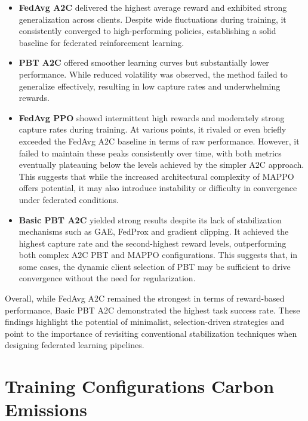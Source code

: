\documentclass[12pt,a4paper,twoside,openany]{book}
\begin{document}
\begin{itemize}
  \item \textbf{FedAvg A2C} delivered the highest average reward and exhibited strong generalization across clients. Despite wide fluctuations during training, it consistently converged to high-performing policies, establishing a solid baseline for federated reinforcement learning.
  
  \item \textbf{PBT A2C} offered smoother learning curves but substantially lower performance. While reduced volatility was observed, the method failed to generalize effectively, resulting in low capture rates and underwhelming rewards.
  
  \item \textbf{FedAvg PPO} showed intermittent high rewards and moderately strong capture rates during training. At various points, it rivaled or even briefly exceeded the FedAvg A2C baseline in terms of raw performance. However, it failed to maintain these peaks consistently over time, with both metrics eventually plateauing below the levels achieved by the simpler A2C approach. This suggests that while the increased architectural complexity of MAPPO offers potential, it may also introduce instability or difficulty in convergence under federated conditions.

  \item \textbf{Basic PBT A2C} yielded strong results despite its lack of stabilization mechanisms such as GAE, FedProx and gradient clipping. It achieved the highest capture rate and the second-highest reward levels, outperforming both complex A2C PBT and MAPPO configurations. This suggests that, in some cases, the dynamic client selection of PBT may be sufficient to drive convergence without the need for regularization.

\end{itemize}

Overall, while FedAvg A2C remained the strongest in terms of reward-based performance, Basic PBT A2C demonstrated the highest task success rate. These findings highlight the potential of minimalist, selection-driven strategies and point to the importance of revisiting conventional stabilization techniques when designing federated learning pipelines.


\section{Training Configurations Carbon Emissions}
\end{document}
